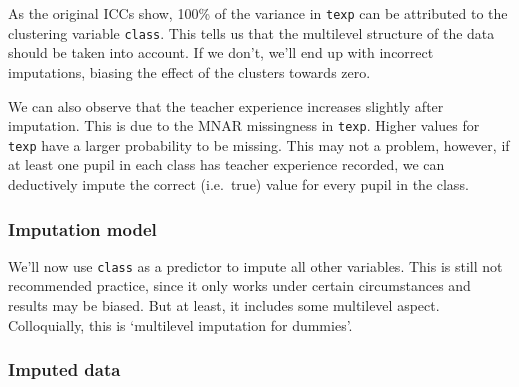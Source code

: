 \documentclass[
]{jss}
\begin{document}
As the original ICCs show, 100\% of the variance in \texttt{texp} can be
attributed to the clustering variable \texttt{class}. This tells us that
the multilevel structure of the data should be taken into account. If we
don't, we'll end up with incorrect imputations, biasing the effect of
the clusters towards zero.

We can also observe that the teacher experience increases slightly after
imputation. This is due to the MNAR missingness in \texttt{texp}. Higher
values for \texttt{texp} have a larger probability to be missing. This
may not a problem, however, if at least one pupil in each class has
teacher experience recorded, we can deductively impute the correct
(i.e.~true) value for every pupil in the class.

\hypertarget{imputation-model-1}{%
\subsubsection{Imputation model}\label{imputation-model-1}}

We'll now use \texttt{class} as a predictor to impute all other
variables. This is still not recommended practice, since it only works
under certain circumstances and results may be biased. But at least, it
includes some multilevel aspect. Colloquially, this is `multilevel
imputation for dummies'.

\begin{CodeChunk}
\end{CodeChunk}

\hypertarget{imputed-data-1}{%
\subsubsection{Imputed data}\label{imputed-data-1}}
\end{document}
